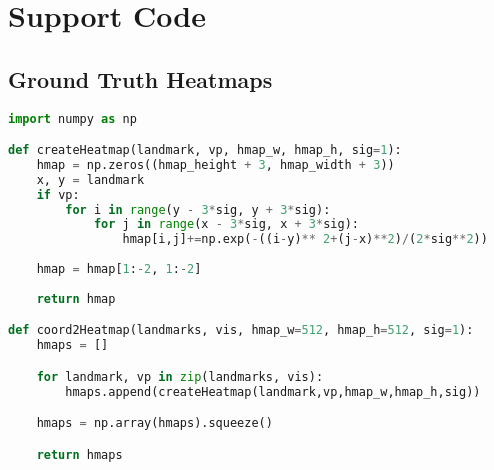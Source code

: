 
\chapter{Support Code} %

\label{AppendixA} %
\lstset{style=mystyle}
\section{Ground Truth Heatmaps}
\label{AppendixA1}
\begin{lstlisting}[language=Python, caption=Ground Truth Heatmaps]
import numpy as np

def createHeatmap(landmark, vp, hmap_w, hmap_h, sig=1):
    hmap = np.zeros((hmap_height + 3, hmap_width + 3))
    x, y = landmark
    if vp:
        for i in range(y - 3*sig, y + 3*sig):
            for j in range(x - 3*sig, x + 3*sig):
                hmap[i,j]+=np.exp(-((i-y)** 2+(j-x)**2)/(2*sig**2))
                
    hmap = hmap[1:-2, 1:-2]
        
    return hmap

def coord2Heatmap(landmarks, vis, hmap_w=512, hmap_h=512, sig=1):
    hmaps = []

    for landmark, vp in zip(landmarks, vis):
        hmaps.append(createHeatmap(landmark,vp,hmap_w,hmap_h,sig))

    hmaps = np.array(hmaps).squeeze()

    return hmaps
\end{lstlisting}

\newpage

